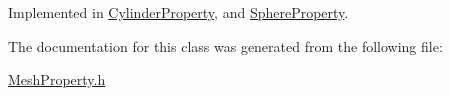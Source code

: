 Implemented in \mbox{\hyperlink{class_cylinder_property_a9e5b9bf44af9e9284004b1674c2f4837}{Cylinder\+Property}}, and \mbox{\hyperlink{class_sphere_property_a61d802642205f2709812de5585705b10}{Sphere\+Property}}.



The documentation for this class was generated from the following file\+:\begin{DoxyCompactItemize}
\item 
\mbox{\hyperlink{_mesh_property_8h}{Mesh\+Property.\+h}}\end{DoxyCompactItemize}
